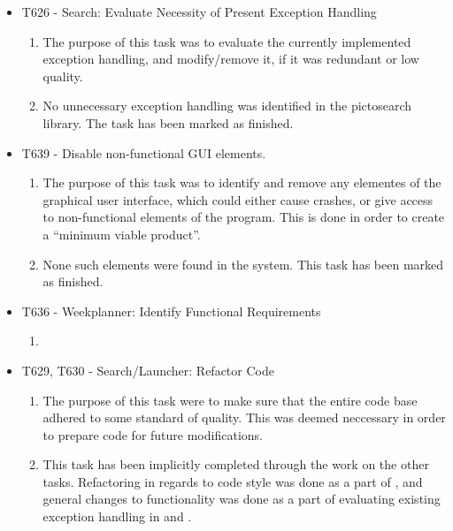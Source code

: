 \begin{itemize}
  	\item T626 - Search: Evaluate Necessity of Present Exception Handling
		\begin{enumerate}
	  		\item The purpose of this task was to evaluate the currently implemented
	  		exception handling, and modify/remove it, if it was redundant or low
	  		quality.
 			\item No unnecessary exception handling was identified in the pictosearch
 			library. The task has been marked as finished.
		\end{enumerate}
  	\item T639 - Disable non-functional GUI elements.
		\begin{enumerate}
 			\item The purpose of this task was to identify and remove any elementes of
 			the graphical user interface, which could either cause crashes, or give
 			access to non-functional elements of the program. This is done in order to
 			create a ``minimum viable product''.
 			\item None such elements were found in the system. This task has been marked
 			as finished.
		\end{enumerate}
	\item T636 - Weekplanner: Identify Functional Requirements
		\begin{enumerate}
 			\item {}
		\end{enumerate}
	\item T629, T630 - Search/Launcher: Refactor Code
		\begin{enumerate}
  			\item The purpose of this task were to make sure that the entire code base
  			adhered to some standard of quality. This was deemed neccessary in order to
  			prepare code for future modifications.
  			\item This task has been implicitly completed through the work on the other
  			tasks. Refactoring in regards to code style was done as a part of
  			, and general changes to functionality was done as a part of
  			evaluating existing exception handling in  and .
		\end{enumerate}

\end{itemize}


